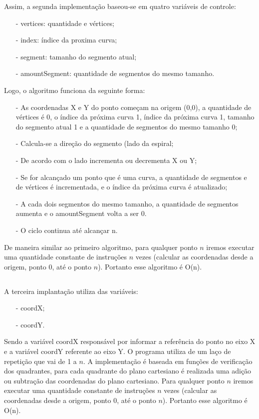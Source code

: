 \documentclass[12pt,a4paper]{article}
\begin{document}
        Assim, a segunda implementação baseou-se em quatro variáveis de controle:
        \begin{itemize}
        	\item[-] vertices: quantidade e vértices;
        	\item[-] index: índice da proxima curva;
        	\item[-] segment: tamanho do segmento atual;
        	\item[-] amountSegment: quantidade de segmentos do mesmo tamanho.
    	\end{itemize}
    	
        Logo, o algoritmo funciona da seguinte forma:
        \begin{itemize}
    	    \item[-] As coordenadas X e Y do ponto começam na origem (0,0), a quantidade de vértices é 0, o índice da próxima curva 1, índice da próxima curva 1, tamanho do segmento atual 1 e a quantidade de segmentos do mesmo tamanho 0;
        	\item[-] Calcula-se a direção do segmento (lado da espiral;
        	\item[-] De acordo com o lado incrementa ou decrementa X ou Y;
        	\item[-] Se for alcançado um ponto que é uma curva, a quantidade de segmentos e de vértices é incrementada, e o índice da próxima curva é atualizado;
        	\item[-] A cada dois segmentos do mesmo tamanho, a quantidade de segmentos aumenta e o amountSegment volta a ser 0.
        	\item[-] O ciclo continua até alcançar n.
    	\end{itemize}
        De maneira similar ao primeiro algoritmo, para qualquer ponto $n$ iremos executar uma quantidade constante de instruções $n$ vezes (calcular as coordenadas desde a origem, ponto 0, até o ponto $n$). Portanto esse algoritmo é O(n).
    
    \subsection{}
        A terceira implantação utiliza das variáveis: 
        \begin{itemize}
    	    \item[-] coordX;
        	\item[-] coordY.
    	\end{itemize}

        Sendo a variável coordX responsável por informar a referência do ponto no eixo X e a variável coordY referente ao eixo Y.
        O programa utiliza de um laço de repetição que vai de 1 a $n$. A implementação é baseada em funções de verificação dos quadrantes, para cada quadrante do plano cartesiano é realizada uma adição ou subtração das coordenadas do plano cartesiano.
        Para qualquer ponto $n$ iremos executar uma quantidade constante de instruções $n$ vezes (calcular as coordenadas desde a origem, ponto 0, até o ponto $n$). Portanto esse algoritmo é O(n).
\end{document}
